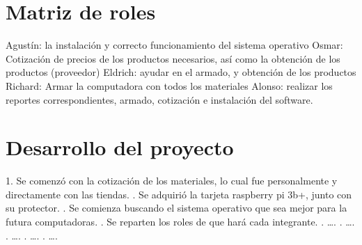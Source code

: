 \documentclass[14pt,letterpaper]{article}
\begin{document}
\section{Matriz de roles} 
Agustín:  la instalación y correcto funcionamiento del sistema operativo
Osmar: Cotización de precios de los productos necesarios, así como la obtención de los productos (proveedor) 
Eldrich: ayudar en el armado, y obtención de los productos
Richard: Armar la computadora con todos los materiales
Alonso: realizar los reportes correspondientes, armado, cotización e instalación del software.
\linebreak
\linebreak
\linebreak
\section{Desarrollo del proyecto}
    1. Se comenzó con la cotización de los materiales, lo cual fue personalmente y directamente con las tiendas.
    . Se adquirió la tarjeta raspberry pi 3b+, junto con su protector.
    . Se comienza buscando el sistema operativo que sea mejor para la futura  computadoras.
    . Se reparten los roles de que hará cada integrante.
    . ….
    . ….
    . ….
    . ….
    . ….
    
\end{document}
